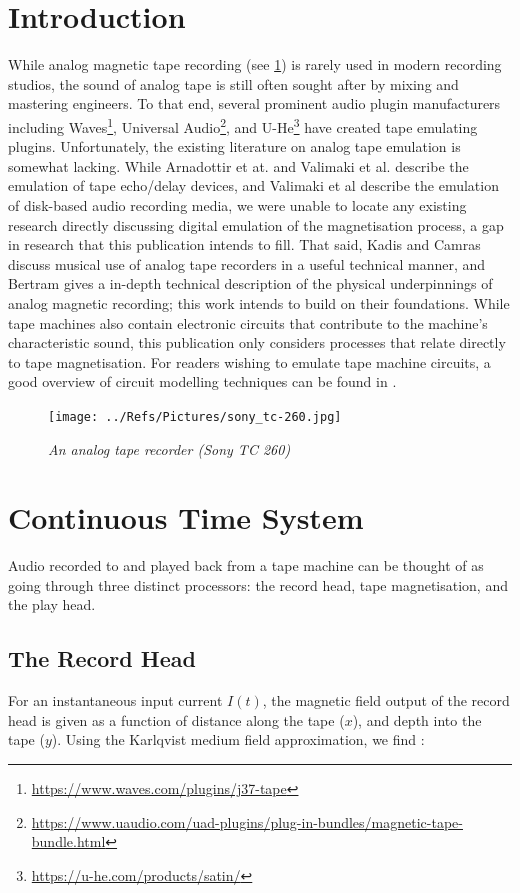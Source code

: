 \documentclass[twoside,a4paper]{article}
\begin{document}
\section{Introduction}
While analog magnetic tape recording (see \cref{TapeMachine}) is rarely used in modern recording
studios, the sound of analog tape is still often sought after by mixing
and mastering engineers. To that end, several prominent audio
plugin manufacturers including Waves\footnote{\url{https://www.waves.com/plugins/j37-tape}},
Universal Audio\footnote{\url{https://www.uaudio.com/uad-plugins/plug-in-bundles/magnetic-tape-bundle.html}},
and U-He\footnote{\url{https://u-he.com/products/satin/}} have created
tape emulating plugins. Unfortunately,
the existing literature on analog tape emulation is somewhat lacking.
While Arnadottir et at. \cite{tapeDelay} and Valimaki et al. \cite{DAFX_book}
describe the emulation of tape echo/delay devices, and Valimaki et al
\cite{disks} describe the emulation of disk-based audio recording media,
we were unable to locate any existing research directly discussing digital
emulation of the magnetisation process, a gap in research that this 
publication intends to fill. That said, Kadis \cite{Kadis} and Camras
\cite{Camras:1987:MRH:27189} discuss musical use of analog tape recorders
in a useful technical manner, and Bertram \cite{1994tmr..book.....B}
gives a in-depth technical description of the physical underpinnings of
analog magnetic recording; this work intends to build on their foundations.
While tape machines also contain electronic circuits that contribute to the 
machine's characteristic sound, this publication only considers processes
that relate directly to tape magnetisation. For readers
wishing to emulate tape machine circuits, a good overview of circuit
modelling techniques can be found in \cite{Yeh}.

\begin{figure}[ht]
    \center
    \texttt{[image: ../Refs/Pictures/sony\_tc-260.jpg]}
    \caption{\label{TapeMachine}{\it An analog tape recorder (Sony TC 260)}}
\end{figure}
%

\section{Continuous Time System}
Audio recorded to and played back from a tape machine can be thought of as going
through three distinct processors: the record head, tape magnetisation, and the play
head.

\subsection{The Record Head}
For an instantaneous input current $I(t)$, the magnetic field output of the record 
head is given as a function of distance along the tape ($x$), and depth into 
the tape ($y$). Using the Karlqvist medium field approximation, we find
\cite{1994tmr..book.....B}:
\end{document}
